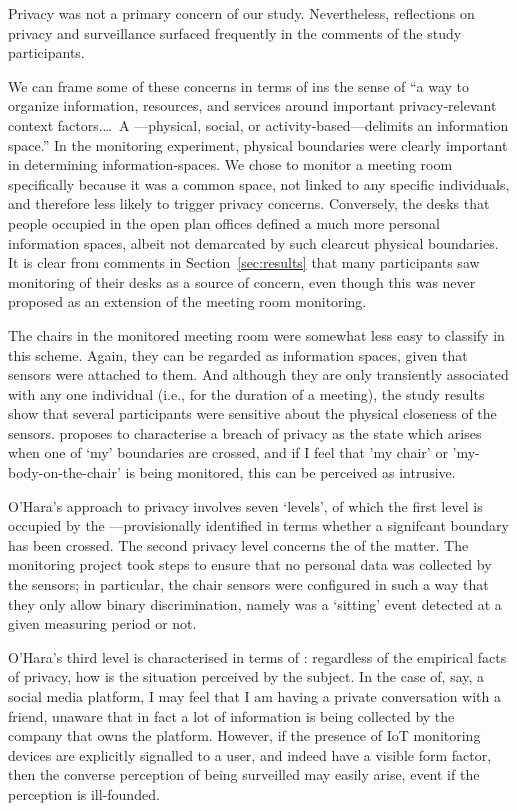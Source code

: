 Privacy was not a primary concern of our study. Nevertheless,
reflections on privacy and surveillance surfaced frequently in the
comments of the study participants.

We can frame some of these concerns in terms of  \cite{Jiang-2002-MPCI} ins the sense of ``a way to organize information, resources, and services
  around important privacy-relevant context factors.\ldots\  A
  ---physical, social, or activity-based---delimits an
  information space.'' In the monitoring experiment, physical boundaries were clearly
important in determining information-spaces. We chose to monitor a meeting room
specifically because it was a common space, not linked to any specific
individuals, and therefore less likely to trigger privacy
concerns. Conversely, the desks that people occupied in the open plan
offices defined a much more personal information spaces, albeit not
demarcated by such clearcut physical boundaries. It is clear from
comments in Section~\ref{sec:results} that many participants saw
monitoring of their desks as a source of concern, even though this was never
proposed as an extension of the meeting room monitoring.

The chairs in the monitored meeting room were somewhat less easy to
classify in this scheme. Again, they can be regarded as information
spaces, given that sensors were attached to them. And although they
are only transiently associated with any one individual (i.e., for the
duration of a meeting), the study results show that several participants were
sensitive about the physical closeness of the
sensors. \cite{Ohara-2016-TSVP} proposes to characterise a breach of privacy as
the state which arises when one of `my' boundaries are crossed, and if
I feel that 'my chair' or 'my-body-on-the-chair' is being monitored,
this can be perceived as intrusive. 

O'Hara's \cite{Ohara-2016-TSVP} approach to privacy involves seven
`levels', of which the first level is occupied by the ---provisionally identified in terms whether a
signifcant boundary has been crossed. The second privacy level concerns the  of the matter. The monitoring project took steps to ensure
that no personal data was collected by the sensors; in particular, the
chair sensors were configured in such a way that they only allow binary
discrimination, namely was a `sitting' event detected at a given
measuring period or not.

 O'Hara's third level is characterised in terms
of : regardless of the empirical facts of privacy, how is the
situation perceived by the subject. In the case of, say, a social media
platform, I may feel that I am having a private conversation with a
friend, unaware that in fact a lot of information is being collected
by the company that owns the platform. However, if the presence of IoT
monitoring devices are explicitly signalled to a user, and indeed have
a visible form factor, then the converse perception of being
surveilled may easily arise, event if the perception is ill-founded.

